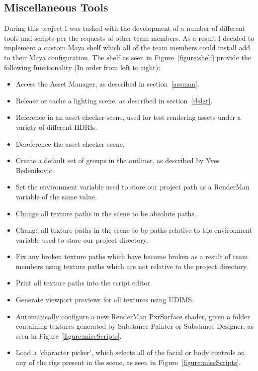 \documentclass[11pt]{article}
\begin{document}
\newpage

\subsection{Miscellaneous Tools}

During this project I was tasked with the development of a number of different tools and scripts per the requests of other team members. As a result I decided to implement a custom Maya shelf which all of the team members could install add to their Maya configuration. The shelf as seen in Figure~\ref{figure:shelf} provide the following functionality (In order from left to right):

\begin{itemize}

\item Access the Asset Manager, as described in section~\ref{assman}.

\item Release or cache a lighting scene, as described in section~\ref{rlslgt}.

\item Reference in an asset checker scene, used for test rendering assets under a variety of different HDRIs.

\item Dereference the asset checker scene.

\item Create a default set of groups in the outliner, as described by Yves Bedenikovic.

\item Set the environment variable used to store our project path as a RenderMan variable of the same value.

\item Change all texture paths in the scene to be absolute paths.

\item Change all texture paths in the scene to be paths relative to the environment variable used to store our project directory.

\item Fix any broken texture paths which have become broken as a result of team members using texture paths which are not relative to the project directory.

\item Print all texture paths into the script editor.

\item Generate viewport previews for all textures using UDIMS.

\item Automatically configure a new RenderMan PxrSurface shader, given a folder containing textures generated by Substance Painter or Substance Designer, as seen in Figure~\ref{figure:miscScripts}.

\item Load a 'character picker', which selects all of the facial or body controls on any of the rigs present in the scene, as seen in Figure~\ref{figure:miscScripts}.

\end{itemize}
\end{document}
